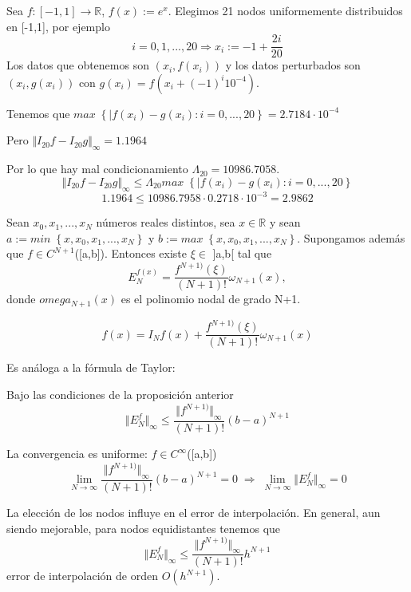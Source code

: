 \begin{ejemplo}
Sea $f : \left[ -1,1 \right] \longrightarrow \mathbb{R}$, $f(x) := e^x$. Elegimos 21 nodos uniformemente distribuidos en [-1,1], por ejemplo
\[ i=0,1,...,20 \Rightarrow x_i := -1 + \frac{2i}{20} \]
Los datos que obtenemos son $(x_i,f(x_i))$ y los datos perturbados son $(x_i,g(x_i))$ con $g(x_i)=f(x_i+(-1)^i10^{-4})$.

Tenemos que $max \; \left\lbrace \vert f(x_i)-g(x_i) : i=0,...,20 \right\rbrace = 2.7184 \cdot 10^{-4}$

Pero $\Vert I_{20}f-I_{20}g \Vert _\infty = 1.1964$

Por lo que hay mal condicionamiento $\Lambda _{20} = 10986.7058$.
\[ \Vert I_{20}f-I_{20}g \Vert _\infty \leq \Lambda _{20} max \; \left\lbrace \vert f(x_i)-g(x_i) : i=0,...,20 \right\rbrace \]
\[ 1.1964 \leq 10986.7958 \cdot 0.2718 \cdot 10^{-3} = 2.9862 \]
\end{ejemplo}

\begin{nprop}
Sean $x_0,x_1,...,x_N$ números reales distintos, sea $x \in \mathbb{R}$ y sean $a:=min \; \left\lbrace x,x_0,x_1,...,x_N \right\rbrace$ y $b:=max \; \left\lbrace x,x_0,x_1,...,x_N \right\rbrace$. Supongamos además que $f \in C^{N+1}$([a,b]). Entonces existe $\xi \in$ ]a,b[ tal que
\[ E_N^{f(x)}=\frac{f^{N+1)}( \xi )}{(N+1)!} \omega _{N+1}(x), \]
donde $omega _{N+1}(x)$ es el polinomio nodal de grado N+1.
\end{nprop}

\[ f(x) = I_Nf(x) + \frac{f^{N+1)}( \xi )}{(N+1)!} \omega _{N+1}(x) \]

Es análoga a la fórmula de Taylor:

\begin{ncor}
Bajo las condiciones de la proposición anterior
\[ \Vert E_N^f \Vert _\infty \leq \frac{\Vert f^{N+1)} \Vert _\infty }{(N+1)!} (b-a)^{N+1} \]
\end{ncor}

La convergencia es uniforme: $f \in C^{\infty}$([a,b])
\[ \lim_{N \rightarrow \infty} \frac{\Vert f^{N+1)} \Vert _\infty }{(N+1)!} (b-a)^{N+1} = 0 \; \Rightarrow \; \lim_{N \rightarrow \infty} \Vert E_N^f \Vert _\infty = 0 \]

La elección de los nodos influye en el error de interpolación. En general, aun siendo mejorable, para nodos equidistantes tenemos que
\[ \Vert E_N^f \Vert _\infty \leq \frac{\Vert f^{N+1)} \Vert _\infty}{(N+1)!}h^{N+1} \]
error de interpolación de orden $O \left( h^{N+1} \right)$.

